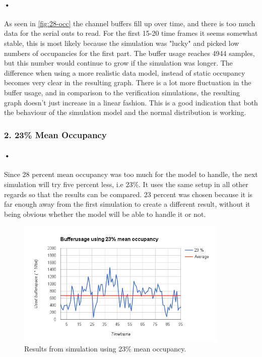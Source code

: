 \documentclass[a4paper, 12pt, openright, twoside]{report}
\begin{document}
\paragraph{•}
As seen in \ref{fig:28-occ} the channel buffers fill up over time, and there is too much data for the serial outs to read.
For the first 15-20 time frames it seems somewhat stable, this is most likely because the simulation was "lucky" and picked low numbers of occupancies for the first part.
The buffer usage reaches 4944 samples, but this number would continue to grow if the simulation was longer.
The difference when using a more realistic data model, instead of static occupancy becomes very clear in the resulting graph.
There is a lot more fluctuation in the buffer usage, and in comparison to the verification simulations, the resulting graph doesn't just increase in a linear fashion.
This is a good indication that both the behaviour of the simulation model and the normal distribution is working.


\subsubsection{2. 23\% Mean Occupancy}

\paragraph{•}
Since 28 percent mean occupancy was too much for the model to handle, the next simulation will try five percent less, i.e 23\%.
It uses the same setup in all other regards so that the results can be compared.
23 percent was chosen because it is far enough away from the first simulation to create a different result, without it being obvious whether the model will be able to handle it or not.

\begin{figure}[h!]
	\centering
		\includegraphics[width=0.9\textwidth]{images/23-occ.png}
		\caption{Results from simulation using 23\% mean occupancy.}
		\label{fig:23-occ}
\end{figure}
\end{document}
